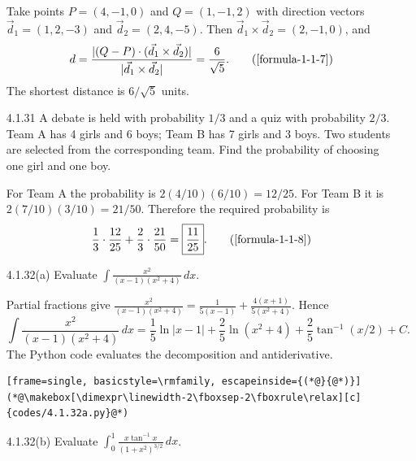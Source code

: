 \begin{enumerate}[label={},font=\normalfont,leftmargin=1.15cm,labelwidth=1.0cm,labelsep=0.15cm,itemindent=0pt,listparindent=0pt,itemsep=\baselineskip,parsep=0pt,topsep=0pt]
\vspace{0.6em}\par\solution


Take points $P=(4,-1,0)$ and $Q=(1,-1,2)$ with direction vectors $\vec d_1=(1,2,-3)$ and $\vec d_2=(2,4,-5)$. Then $\vec d_1\times\vec d_2=(2,-1,0)$, and
\begin{equation*}
d=\frac{|(Q-P)\cdot(\vec d_1\times\vec d_2)|}{|\vec d_1\times\vec d_2|}=\frac{6}{\sqrt5}.
\tag*{(\ref{formula-1-1-7})}\end{equation*}
The shortest distance is $\boxed{6/\sqrt5}$ units.

\item[4.1.31] A debate is held with probability $1/3$ and a quiz with probability $2/3$. Team A has 4 girls and 6 boys; Team B has 7 girls and 3 boys. Two students are selected from the corresponding team. Find the probability of choosing one girl and one boy.

\vspace{0.6em}\par\solution


For Team A the probability is $2(4/10)(6/10)=12/25$. For Team B it is $2(7/10)(3/10)=21/50$. Therefore the required probability is
\begin{equation*}
\frac13\cdot\frac{12}{25}+\frac23\cdot\frac{21}{50}=\boxed{\frac{11}{25}}.
\tag*{(\ref{formula-1-1-8})}\end{equation*}

\item[4.1.32(a)] Evaluate $\displaystyle\int\frac{x^2}{(x-1)(x^2+4)}\,dx$.

\vspace{0.6em}\par\solution

Partial fractions give $\frac{x^2}{(x-1)(x^2+4)}=\frac{1}{5(x-1)}+\frac{4(x+1)}{5(x^2+4)}$. Hence
\[
\boxed{\int\frac{x^2}{(x-1)(x^2+4)}\,dx=\frac15\ln|x-1|+\frac25\ln(x^2+4)+\frac25\tan^{-1}(x/2)+C}.
\]
The Python code evaluates the decomposition and antiderivative.
\begin{lstlisting}[frame=single, basicstyle=\rmfamily, escapeinside={(*@}{@*)}]
(*@\makebox[\dimexpr\linewidth-2\fboxsep-2\fboxrule\relax][c]{codes/4.1.32a.py}@*)
\end{lstlisting}

\item[4.1.32(b)] Evaluate $\displaystyle\int_0^1\frac{x\tan^{-1}x}{(1+x^2)^{3/2}}\,dx$.

\vspace{0.6em}\par\solution


\end{enumerate}
